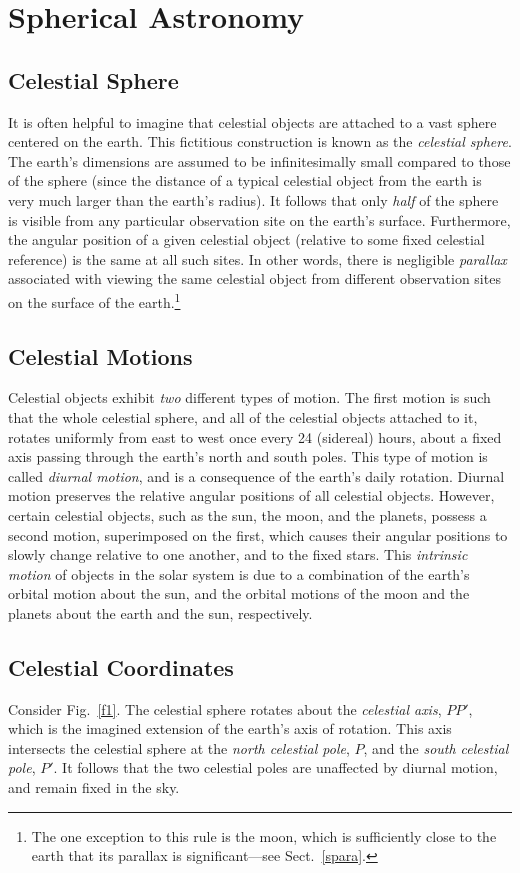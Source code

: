 \chapter{Spherical Astronomy}
\section{Celestial Sphere}
It is often helpful to imagine that celestial objects are attached to a vast sphere centered on the
earth. This fictitious construction is known as the {\em celestial sphere}. The earth's dimensions are assumed 
to be infinitesimally small compared to those  of the sphere (since the distance of a typical celestial object from 
the earth is very much larger than the earth's radius).  It follows that only {\em half}\/ of the sphere  is visible from
any particular observation site on the earth's surface. Furthermore, the angular position of a given celestial object (relative to some fixed celestial reference) is the 
same at all such sites. In other words, there is negligible {\em parallax}\/ associated
with viewing the same celestial object from different observation sites on the surface of the earth.\footnote{
 The one exception to this rule is the moon, which is sufficiently close to the earth
 that its parallax is significant---see Sect.~\ref{spara}.}

\section{Celestial Motions}
Celestial objects exhibit {\em two}\/ different types of motion. The first motion is such that the whole celestial sphere, and all of the
celestial objects attached to it, rotates
uniformly from east to west once every 24 (sidereal) hours, about a fixed axis passing through the earth's north and south poles. This type of motion is called {\em diurnal motion}, and is a consequence of the earth's daily  rotation. Diurnal motion preserves the relative angular positions of all celestial objects. However, certain
celestial objects, such as the sun, the moon, and the planets, possess a second motion, superimposed on the
first, which causes their angular positions to slowly change relative to one another, and to the fixed stars. This {\em intrinsic
motion}\/ of objects in the solar system is due to a combination of the earth's orbital motion about the sun, and the orbital motions of the moon and the planets about the earth and the sun, respectively.

\section{Celestial Coordinates}
Consider Fig.~\ref{f1}. The celestial sphere rotates about the {\em celestial axis}, $PP'$,  which is the imagined  extension of the  earth's axis of rotation. This axis intersects the celestial sphere at the {\em north celestial pole}, $P$, and the {\em south celestial pole}, $P'$. It follows that the two celestial poles are
unaffected by diurnal motion, and remain fixed in the sky.


